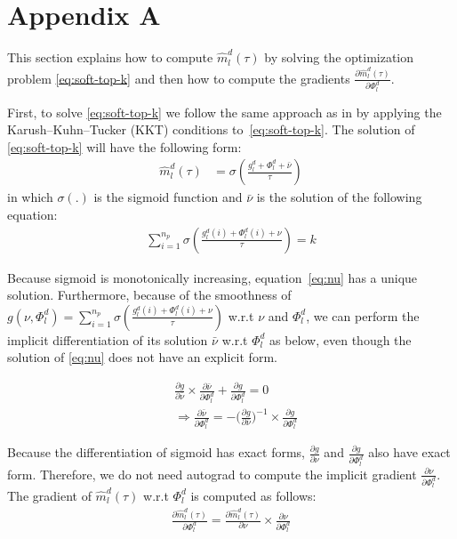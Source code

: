 \documentclass[11pt]{article}
\begin{document}


\appendix
\section{Appendix A}
\label{appendix:a}
This section explains how to compute $\hat{m}_l^d(\tau)$ by solving the optimization problem \eqref{eq:soft-top-k} and then how to compute the gradients $\frac{\partial \hat{m}_l^d(\tau)}{\partial \Phi_l^d}$.

First, to solve \eqref{eq:soft-top-k} we follow the same approach as in \cite{amos19lml,amos20differential} by applying the Karush–Kuhn–Tucker (KKT) conditions to~\eqref{eq:soft-top-k}. The solution of \eqref{eq:soft-top-k} will have the following form:
\begin{align}
\hat{m}_l^d(\tau) &= \sigma(\frac{g_l^d + \Phi_l^d + \bar{\nu}}{\tau}) \label{eq:soft-m}
\end{align}
in which $\sigma(.)$ is the sigmoid function and $\bar{\nu}$ is the solution of the following equation:
\begin{align}
\displaystyle{\mathop{\sum}_{i=1}^{n_p}} \sigma(\frac{g_l^d(i) + \Phi_l^d(i) + \nu}{\tau}) = k \label{eq:nu}
\end{align}

Because sigmoid is monotonically increasing, equation~\eqref{eq:nu} has a unique solution. Furthermore,  because of the smoothness of $g(\nu,\Phi_l^d) = \displaystyle{\mathop{\sum}_{i=1}^{n_p}} \sigma(\frac{g_l^d(i) + \Phi_l^d(i) + \nu}{\tau})$ w.r.t $\nu$ and $\Phi_l^d$, we can perform the implicit differentiation of its solution $\bar{\nu}$ w.r.t $\Phi_l^d$ as below, even though the solution of \eqref{eq:nu} does not have an explicit form.

\begin{align*}
&\frac{\partial g}{\partial \bar{\nu}} \times \frac{\partial \bar{\nu}}{\partial \Phi_l^d} + \frac{\partial g}{\partial \Phi_l^d} = 0 \\
& \Rightarrow \frac{\partial \bar{\nu}}{\partial \Phi_l^d} = - \big(\frac{\partial g}{\partial \bar{\nu}}\big)^{-1} \times \frac{\partial g}{\partial \Phi_l^d}
\end{align*}

Because the differentiation of sigmoid has exact forms, $\frac{\partial g}{\partial \nu}$ and $\frac{\partial g}{\partial \Phi_l^d}$ also have exact form. Therefore, we do not need autograd to compute the implicit gradient $\frac{\partial \nu}{\partial \Phi_l^d}$. The gradient of $\hat{m}_l^d(\tau)$ w.r.t $\Phi_l^d$ is computed as follows:
\begin{align}
\frac{\partial \hat{m}_l^d(\tau)}{\partial \Phi_l^d} = \frac{\partial \hat{m}_l^d(\tau)}{\partial \nu} \times \frac{\partial \nu}{\partial \Phi_l^d}
\end{align}
\end{document}

